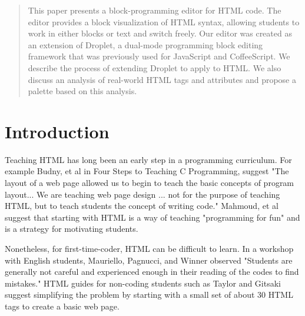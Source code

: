 \documentclass[conference]{IEEEtran}
\begin{document}
\begin{abstract}
This paper presents a block-programming editor for HTML code.  The editor provides a block visualization of HTML syntax, allowing students to work in either blocks or text and switch freely.  Our editor was created as an extension of Droplet, a dual-mode programming block editing framework that was previously used for JavaScript and CoffeeScript. We describe the process of extending Droplet to apply to HTML. We also discuss an analysis of real-world HTML tags and attributes and propose a palette based on this analysis.

\end{abstract}





%
\IEEEpeerreviewmaketitle

\section{Introduction}
Teaching HTML has long been an early step in a programming curriculum.  For example Budny, et al \cite{Budny} in Four Steps to Teaching C Programming, suggest "The layout of a web page allowed us to begin to teach the basic concepts of program layout... We are teaching web page design ... not for the purpose of teaching HTML, but to teach students the concept of writing code." Mahmoud, et al \cite{Mahmoud} suggest that starting with HTML is a way of teaching "programming for fun" and is a strategy for motivating students.

Nonetheless, for first-time-coder, HTML can be difficult to learn.  In a workshop with English students, Mauriello, Pagnucci, and Winner \cite{Mauriello} observed "Students are generally not careful and experienced enough in their reading of the codes to find mistakes."  HTML guides for non-coding students such as Taylor and Gitsaki \cite{Taylor} suggest simplifying the problem by starting with a small set of about 30 HTML tags to create a basic web page.
\end{document}
